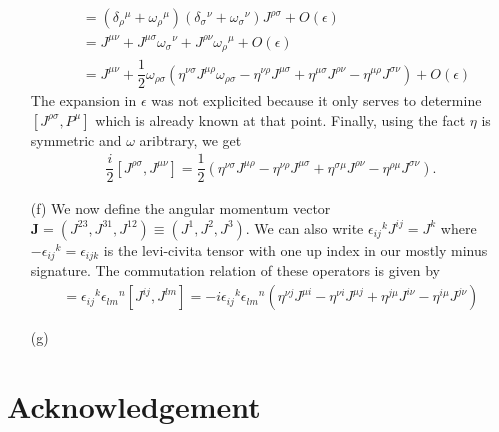 \documentclass[10pt, a4paper]{article}
\begin{document}
\begin{enumerate}
\begin{align*}
      &= (\delta_\rho{ }^\mu + \omega_\rho{ }^\mu)(\delta_\sigma{ }^\nu+\omega_\sigma{ }^\nu) J^{\rho \sigma} + O(\epsilon)\\
      &= J^{\mu \nu} + J^{\mu \sigma} \omega_\sigma{ }^\nu + J^{\rho \nu}\omega_\rho{ }^\mu + O(\epsilon)\\
      &= J^{\mu \nu} + \dfrac{1}{2} \omega_{\rho\sigma} \left(\eta^{\nu \sigma}J^{\mu \rho} \omega_{\rho\sigma} -\eta^{\nu \rho}J^{\mu \sigma} + \eta^{\mu \sigma} J^{\rho \nu} - \eta^{\mu \rho} J^{\sigma \nu}\right) + O(\epsilon)
    \end{align*}
    The expansion in $\epsilon$ was not explicited because it only serves to determine $[J^{\rho \sigma}, P^{\mu}]$ which is already known at that point. Finally, using the fact $\eta$ is symmetric and $\omega$ aribtrary, we get 
    \begin{align*}
      \dfrac{i}{2} [J^{\rho \sigma}, J^{\mu \nu}] = \dfrac{1}{2} \left(\eta^{\nu \sigma} J^{\mu \rho} -\eta^{\nu \rho} J^{\mu \sigma} + \eta^{\sigma\mu} J^{\rho \nu} - \eta^{\rho\mu} J^{\sigma \nu}\right).
    \end{align*}
  \item[(f)] We now define the angular momentum vector $\mathbf{J} = (J^{23}, J^{31}, J^{12}) \equiv (J^1, J^2, J^3)$. We can also write $\epsilon_{ij}{}^k J^{ij} =  J^k$ where $-\epsilon_{ij}{}^k = \epsilon_{ijk}$ is the levi-civita tensor with one up index in our mostly minus signature. The commutation relation of these operators is given by
  \begin{align*}
    [J^k, J^n] = \epsilon_{ij}{}^{k} \epsilon_{lm}{}^{n} [J^{ij}, J^{lm}] = -i \epsilon_{ij}{}^{k} \epsilon_{lm}{}^{n} \left(\eta^{\nu j} J^{\mu i} -\eta^{\nu i} J^{\mu j} + \eta^{j\mu} J^{i \nu} - \eta^{i\mu} J^{j\nu}\right)
  \end{align*}  
  \item[(g)]

\end{enumerate}




\section{Acknowledgement}


\makereferences


\end{document}
